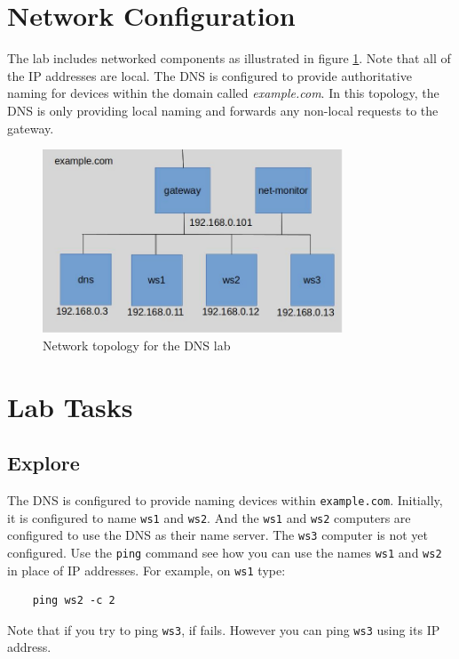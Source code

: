 \section{Network Configuration}
The lab includes networked components as illustrated in figure \ref{fig:topology}.  Note that all of
the IP addresses are local.  
The DNS is configured to provide authoritative naming for devices within the domain called
\textit{example.com}.  
In this topology, the DNS is only providing local naming and forwards any
non-local requests to the gateway.


\begin{figure}[H]
\begin{center}
\includegraphics [width=0.8\textwidth]{dns.jpg}
\end{center}
\caption{Network topology for the DNS lab}
\label{fig:topology}
\end{figure}


\section{Lab Tasks}
\subsection{Explore}
The DNS is configured to provide naming devices within {\tt example.com}.  Initially, it is configured
to name {\tt ws1} and {\tt ws2}.  And the {\tt ws1} and {\tt ws2} computers
are configured to use the DNS as their name server.  The {\tt ws3} computer is not yet configured.  Use the 
{\tt ping} command see how you can use the names {\tt ws1} and {\tt ws2} in place of IP addresses.  For
example, on {\tt ws1} type:
\begin{verbatim}
    ping ws2 -c 2
\end{verbatim} 
\noindent Note that if you try to ping {\tt ws3}, if fails.  However you can ping {\tt ws3} using its 
IP address.

